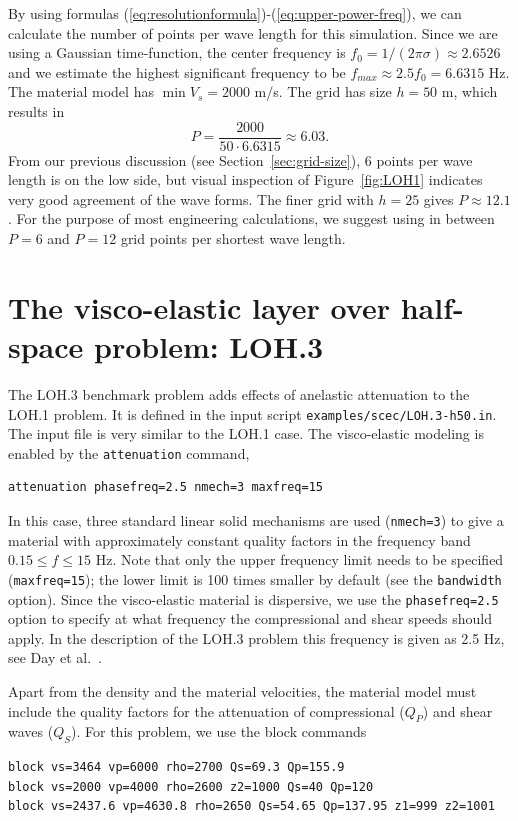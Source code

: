\documentclass[11pt]{report}
\begin{document}
{By using formulas (\ref{eq:resolutionformula})-(\ref{eq:upper-power-freq}), we can calculate the
number of points per wave length for this simulation. Since we are using a Gaussian time-function,
the center frequency is $f_0=1/(2\pi\sigma)\approx 2.6526$ and we estimate the highest significant
frequency to be $f_{max}\approx 2.5 f_0 = 6.6315$ Hz. The material model has $\min V_s = 2000$
m/s. The grid has size $h=50$ m, which results in
\[
	P = \dfrac{2000}{50\cdot 6.6315} \approx 6.03.
\]
From our previous discussion (see Section~\ref{sec:grid-size}), 6 points per wave length is on the
low side, but visual inspection of Figure~\ref{fig:LOH1} indicates very good agreement of the wave
forms. The finer grid with $h=25$ gives $P\approx 12.1$. For the purpose of most engineering
calculations, we suggest using in between $P=6$ and $P=12$ grid points per shortest wave length.

\section{The visco-elastic layer over half-space problem: LOH.3}
The LOH.3 benchmark problem adds effects of anelastic attenuation to the LOH.1 problem. It is
defined in the input script \verb+examples/scec/LOH.3-h50.in+. The input file is very similar to the
LOH.1 case. The visco-elastic modeling is enabled by the \verb+attenuation+ command,
\begin{verbatim}
attenuation phasefreq=2.5 nmech=3 maxfreq=15
\end{verbatim}
In this case, three standard linear solid mechanisms are used (\verb+nmech=3+) to give a material
with approximately constant quality factors in the frequency band $0.15 \leq f \leq 15$ Hz. Note
that only the upper frequency limit needs to be specified (\verb+maxfreq=15+); the lower limit is
100 times smaller by default (see the \verb+bandwidth+ option). Since the visco-elastic material is dispersive,
we use the \verb+phasefreq=2.5+ option to specify at what frequency the compressional and shear
speeds should apply. In the description of the LOH.3 problem this frequency is given as 2.5 Hz, see
Day et al.~\cite{Day-2003}.

Apart from the density and the material velocities, the material model must include the quality
factors for the attenuation of compressional ($Q_P$) and shear waves ($Q_S$). For this problem, we
use the block commands
\begin{verbatim}
block vs=3464 vp=6000 rho=2700 Qs=69.3 Qp=155.9
block vs=2000 vp=4000 rho=2600 z2=1000 Qs=40 Qp=120
block vs=2437.6 vp=4630.8 rho=2650 Qs=54.65 Qp=137.95 z1=999 z2=1001
\end{verbatim}

}
\end{document}
